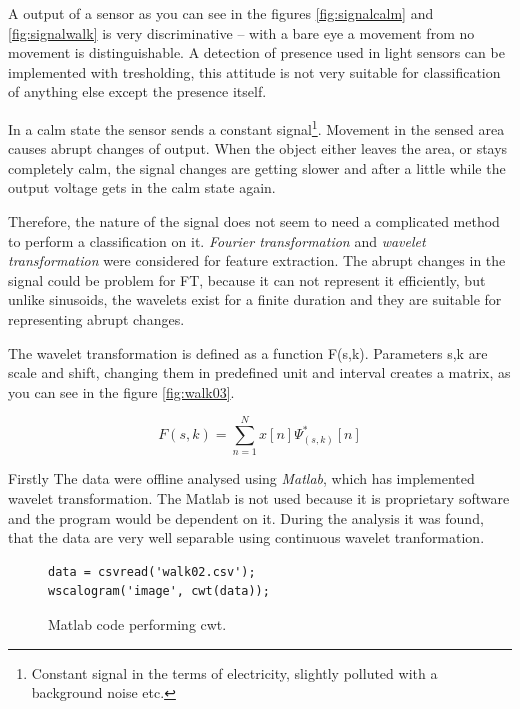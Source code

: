 A output of a sensor as you can see in the figures \ref{fig:signalcalm} and \ref{fig:signalwalk}
is very discriminative -- with a bare eye a movement from no movement is distinguishable.
A detection of presence used in light sensors can be implemented with tresholding, this attitude is
not very suitable for classification of anything else except the presence itself.

In a calm state the sensor sends a constant signal\footnote{Constant signal in the terms
of electricity, slightly polluted with a background noise etc.}. Movement in the sensed area causes
abrupt changes of output. When the object either leaves the area, or stays completely calm, the signal
changes are getting slower and after a little while the output voltage gets in the calm state again.

Therefore, the nature of the signal does not seem to need a complicated method to perform a classification on it.
{\it Fourier transformation} and {\it wavelet transformation} were considered for feature
extraction. The abrupt changes in the signal could be problem for FT, because it can not represent
it efficiently\cite{SinglePIR}, %
but unlike sinusoids, the wavelets exist for a finite duration and they are suitable for representing
abrupt changes.

The wavelet transformation is defined as a function F(s,k). Parameters s,k are scale and shift, changing
them in predefined unit and interval creates a matrix, as you can see in the figure \ref{fig:walk03}.

\begin{equation}
F(s,k) = \sum_{n=1}^{N} x[n] \Psi_{(s,k)}^{*}[n]
\end{equation}

Firstly The data were offline analysed using {\it Matlab}, which has implemented wavelet transformation.
The Matlab is not used because it is proprietary software and the program would be dependent on it.
During the analysis it was found, that the data are very well separable using continuous wavelet tranformation.

\begin{figure}[h!]
\begin{lstlisting}[style=matlab]
data = csvread('walk02.csv');
wscalogram('image', cwt(data));
\end{lstlisting}
\caption{Matlab code performing cwt.\label{list:cwtmatlab}}
\end{figure}

